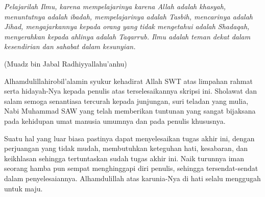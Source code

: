 \documentclass[skripsi]{unhasskripsi}
\theoremstyle{definition}
\begin{document}
    \cover

    \titlepageind

    \approvalpage

    \acknowledment
    \begin{flushright}
        \Large\emph{}
    \end{flushright}

    \motto
    \emph{Pelajarilah Ilmu, karena mempelajarinya karena Allah adalah khasyah, menuntutnya adalah ibadah, mempelajarinya adalah Tasbih, mencarinya adalah Jihad, mengajarkannya kepada orang yang tidak mengetahui adalah Shadaqah, menye\-rahkan kepada ahlinya adalah Taqarrub. Ilmu adalah teman dekat dalam kesendirian dan sahabat dalam kesunyian.}
    \begin{flushright}
        (Muadz bin Jabal Radhiyyallahu'anhu)
    \end{flushright}

    \preface
    Alhamdulillahirobil'alamin syukur kehadirat Allah SWT atas limpahan rahmat serta hidayah-Nya kepada penulis atas terselesaikannya skripsi ini. Sholawat dan salam semoga senantiasa tercurah kepada junjungan, suri teladan yang mulia, Nabi Muhammad SAW yang telah memberikan tuntunan yang sangat bijaksana pada kehidupan umat manusia umumnya dan pada penulis khususnya.

    Suatu hal yang luar biasa pastinya dapat menyelesaikan tugas akhir ini, de\-ngan perjuangan yang tidak mudah, membutuhkan keteguhan hati, kesabaran, dan keikhlasan sehingga tertuntaskan sudah tugas akhir ini. Naik turunnya iman seorang hamba pun sempat menghinggapi diri penulis, sehingga tersendat-sendat dalam penyelesaiannya. Alhamdulillah atas karunia-Nya di hati selalu menggugah untuk maju.
\end{document}
